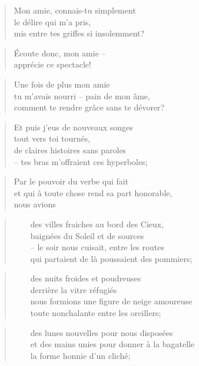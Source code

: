   \begin{verse}
    Mon amie, connais-tu simplement\\
    le délire qui m’a pris,\\
    mis entre tes griffes si insolemment?
  \end{verse}
  \begin{verse}
    Écoute donc, mon amie --\\
    apprécie ce spectacle!
  \end{verse}
  \begin{verse}
    Une fois de plus mon amie\\
    tu m’avais nourri -- pain de mon âme,\\
    comment te rendre grâce sans te dévorer?
  \end{verse}
  \begin{verse}
    Et puis j’eus de nouveaux songes\\
    tout vers toi tournés,\\
    de claires histoires sans paroles\\
    -- tes bras m’offraient ces hyperboles;
  \end{verse}
  \begin{verse}
    Par le pouvoir du verbe qui fait\\
    et qui à toute chose rend sa part honorable,\\
    nous avions
  \end{verse}
  \begin{verse}
    ~~~~des villes fraiches au bord des Cieux,\\
    ~~~~baignées du Soleil et de sources\\
    ~~~~-- le soir nous cuisait, entre les routes\\
    ~~~~qui partaient de là poussaient des pommiers;
  \end{verse}
  \begin{verse}
    ~~~~des nuits froides et poudreuses\\
    ~~~~derrière la vitre réfugiés\\
    ~~~~nous formions une figure de neige amoureuse\\
    ~~~~toute nonchalante entre les oreillers;
  \end{verse}
  \begin{verse}
    ~~~~des lunes nouvelles pour nous disposées\\
    ~~~~et des mains unies pour donner à la bagatelle\\
    ~~~~la forme honnie d’un cliché;
  \end{verse}
